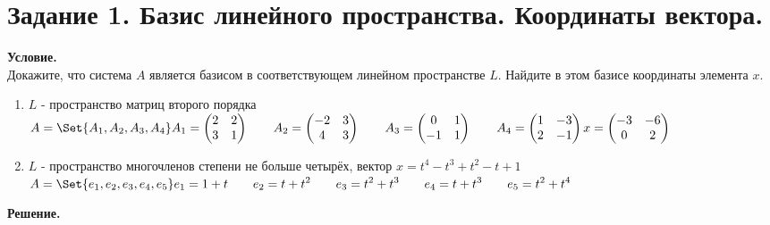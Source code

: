 \section{Задание 1. Базис линейного пространства. Координаты вектора.}

\textbf{Условие.}\\
Докажите, что система $A$ является базисом в соответствующем линейном пространстве $L$.
Найдите в этом базисе координаты элемента $x$.

\begin{enumerate}
    \item $L$ - пространство матриц второго порядка\\
    $\displaystyle A = \Set{A_1, A_2, A_3, A_4}\\
    A_1 = \begin{pmatrix}2 & 2 \\ 3 & 1\end{pmatrix}\qquad
    A_2 = \begin{pmatrix}-2 & 3 \\ 4 & 3\end{pmatrix}\qquad
    A_3 = \begin{pmatrix}0 & 1 \\ -1 & 1\end{pmatrix}\qquad
    A_4 = \begin{pmatrix}1 & -3 \\ 2 & -1\end{pmatrix}\\
    x = \begin{pmatrix}-3 & -6 \\ 0 & 2\end{pmatrix}$
    \item $L$ - пространство многочленов степени не больше четырёх, вектор $x = t^4 - t^3 + t^2 - t + 1$\\
    $\displaystyle A = \Set{e_1, e_2, e_3, e_4, e_5}\\
    e_1 = 1 + t\qquad
    e_2 = t + t^2\qquad
    e_3 = t^2 + t^3\qquad
    e_4 = t + t^3\qquad
    e_5 = t^2 + t^4\qquad$
\end{enumerate}
\vspace{10mm}
\noindent\textbf{Решение.}
